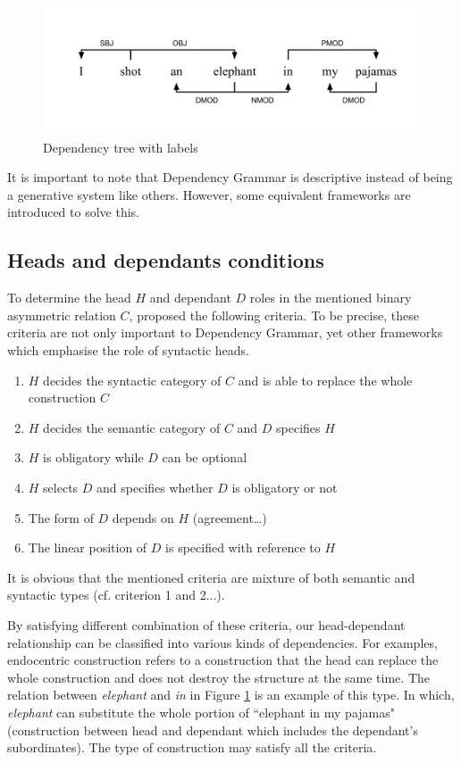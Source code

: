 \documentclass[12pt]{article}
\begin{document}
\begin{figure}[h]
	\centering
	\includegraphics[width=\linewidth]{DG_tree_2}
	\caption{Dependency tree with labels}
	\label{fig:dg_tree_ex}
\end{figure}

It is important to note that Dependency Grammar is descriptive instead of being a generative system like others. However, some equivalent frameworks are introduced to solve this.

\subsection{Heads and dependants conditions} \label{head_dep}

To determine the head $H$ and dependant $D$ roles in the mentioned binary asymmetric relation $C$, \cite{zwicky1985heads} proposed the following criteria. To be precise, these criteria are not only important to Dependency Grammar, yet other frameworks which emphasise the role of syntactic heads.
\begin{enumerate}
	\item $H$ decides the syntactic category of $C$ and is able to replace the whole construction $C$
	\item $H$ decides the semantic category of $C$ and $D$ specifies $H$
	\item $H$ is obligatory while $D$ can be optional
	\item $H$ selects $D$ and specifies whether $D$ is obligatory or not
	\item The form of $D$ depends on $H$ (agreement\dots)
	\item The linear position of $D$ is specified with reference to $H$
\end{enumerate}

It is obvious that the mentioned criteria are mixture of both semantic and syntactic types (cf. criterion 1 and 2...).

By satisfying different combination of these criteria, our head-dependant relationship can be classified into various kinds of dependencies. For examples, endocentric construction refers to a construction that the head can replace the whole construction and does not destroy the structure at the same time. The relation between \textit{elephant} and \textit{in} in Figure \ref{fig:dg_tree_ex} is an example of this type. In which, \textit{elephant} can substitute the whole portion of ``elephant in my pajamas" (construction between head and dependant which includes the dependant's subordinates). The type of construction may satisfy all the criteria.
\end{document}
